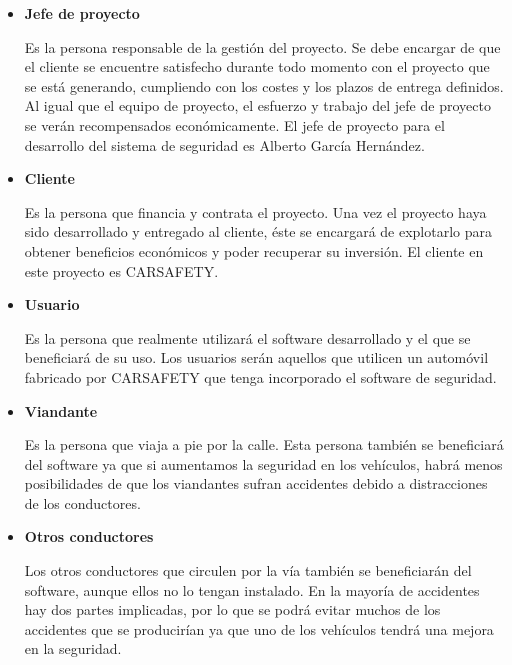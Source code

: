 \begin{itemize}[-]
\begin{itemize}[-]
\end{itemize}
\item \textbf{Jefe de proyecto}
\par Es la persona responsable de la gestión del proyecto. Se debe encargar de que el cliente se encuentre satisfecho durante todo momento con el proyecto que se está generando, cumpliendo con los costes y los plazos de entrega definidos. Al igual que el equipo de proyecto, el esfuerzo y trabajo del jefe de proyecto se verán recompensados económicamente. El jefe de proyecto para el desarrollo del sistema de seguridad es Alberto García Hernández.
\item \textbf{Cliente}
\par Es la persona que financia y contrata el proyecto. Una vez el proyecto haya sido desarrollado y entregado al cliente, éste se encargará de explotarlo para obtener beneficios económicos y poder recuperar su inversión. El cliente en este proyecto es CARSAFETY.
\item \textbf{Usuario}
\par Es la persona que realmente utilizará el software desarrollado y el que se beneficiará de su uso. Los usuarios serán aquellos que utilicen un automóvil fabricado por CARSAFETY que tenga incorporado el software de seguridad.
\item \textbf{Viandante}
\par Es la persona que viaja a pie por la calle. Esta persona también se beneficiará del software ya que si aumentamos la seguridad en los vehículos, habrá menos posibilidades de que los viandantes sufran accidentes debido a distracciones de los conductores.
\item \textbf{Otros conductores}
\par Los otros conductores que circulen por la vía también se beneficiarán del software, aunque ellos no lo tengan instalado. En la mayoría de accidentes hay dos partes implicadas, por lo que se podrá evitar muchos de los accidentes que se producirían ya que uno de los vehículos tendrá una mejora en la seguridad. 
\end{itemize}
